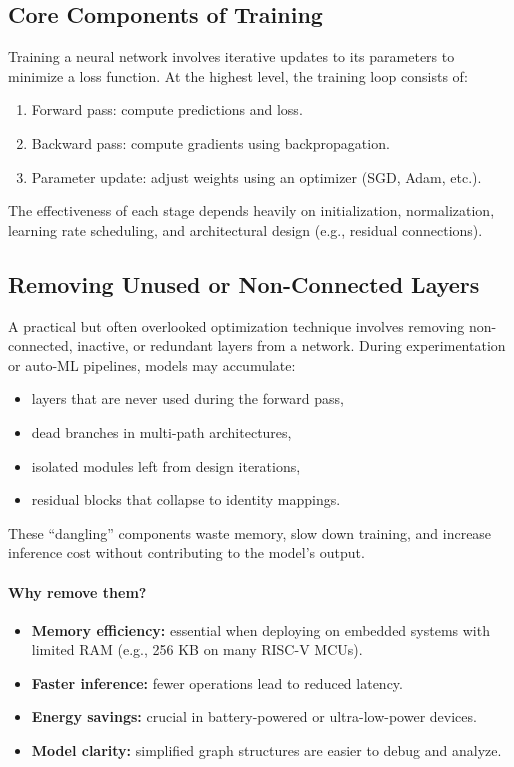 \documentclass[12pt,a4paper]{report}
\begin{document}
\vspace{1em}
\subsection{Core Components of Training}

Training a neural network involves iterative updates to its parameters to minimize a loss function.  
At the highest level, the training loop consists of:
\begin{enumerate}
    \item Forward pass: compute predictions and loss.
    \item Backward pass: compute gradients using backpropagation.
    \item Parameter update: adjust weights using an optimizer (SGD, Adam, etc.).
\end{enumerate}

The effectiveness of each stage depends heavily on initialization, normalization, learning rate scheduling, and architectural design (e.g., residual connections).

\vspace{1em}
\subsection{Removing Unused or Non-Connected Layers}

A practical but often overlooked optimization technique involves removing non-connected, inactive, or redundant layers from a network.  
During experimentation or auto-ML pipelines, models may accumulate:
\begin{itemize}
    \item layers that are never used during the forward pass,
    \item dead branches in multi-path architectures,
    \item isolated modules left from design iterations,
    \item residual blocks that collapse to identity mappings.
\end{itemize}

These “dangling” components waste memory, slow down training, and increase inference cost without contributing to the model’s output.

\paragraph{Why remove them?}
\begin{itemize}
    \item \textbf{Memory efficiency:} essential when deploying on embedded systems with limited RAM (e.g., 256 KB on many RISC-V MCUs).
    \item \textbf{Faster inference:} fewer operations lead to reduced latency.
    \item \textbf{Energy savings:} crucial in battery-powered or ultra-low-power devices.
    \item \textbf{Model clarity:} simplified graph structures are easier to debug and analyze.
\end{itemize}
\end{document}
